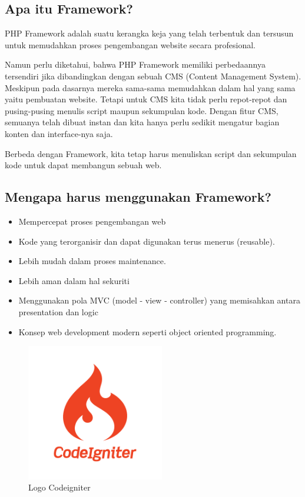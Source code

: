 \subsection{Apa itu Framework?}
PHP Framework adalah suatu kerangka keja yang telah terbentuk dan tersusun untuk memudahkan proses pengembangan website  secara profesional.

Namun perlu diketahui, bahwa PHP Framework memiliki perbedaannya tersendiri jika dibandingkan dengan sebuah CMS (Content Management System). Meskipun pada dasarnya mereka sama-sama memudahkan dalam hal yang sama yaitu pembuatan website. Tetapi untuk CMS  kita tidak perlu repot-repot dan pusing-pusing menulis script maupun sekumpulan kode. Dengan fitur CMS, semuanya telah dibuat instan dan kita hanya perlu sedikit mengatur bagian konten dan interface-nya saja.

Berbeda dengan Framework, kita tetap harus menuliskan script dan sekumpulan kode untuk dapat membangun sebuah web. 

\subsection{Mengapa harus menggunakan Framework?}
\begin{itemize}
	\item Mempercepat proses pengembangan web
	\item Kode yang terorganisir dan dapat digunakan terus menerus (reusable).
	\item Lebih mudah dalam proses maintenance.
	\item Lebih aman dalam hal sekuriti
	\item Menggunakan pola MVC (model - view - controller) yang memisahkan antara presentation dan logic
	\item Konsep web development modern seperti object oriented programming.

\end{itemize}

	\begin{figure}[H]
		\includegraphics[width=6cm]{figures/web/logocodeigniter.png}
		\centering
		\caption{Logo Codeigniter}
	\end{figure}

